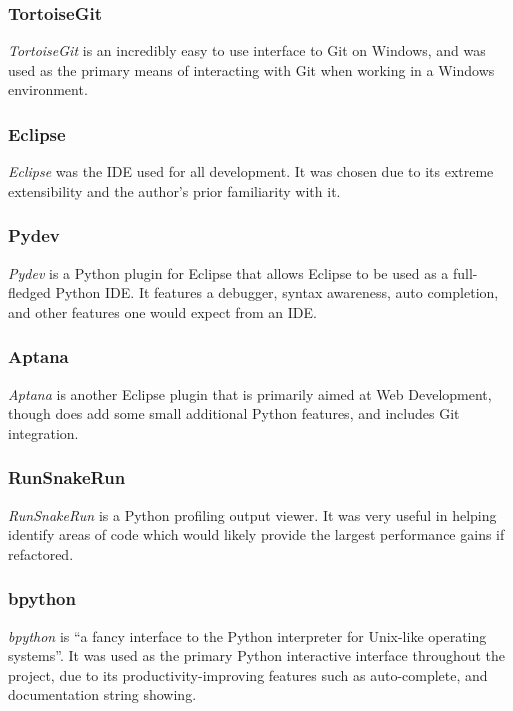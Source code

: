 \documentclass[a4paper,11pt]{report}
\begin{document}
\subsubsection*{TortoiseGit}
\emph{TortoiseGit} \citep{prog:tortoisegit} is an incredibly easy to use interface to Git on Windows, and was used as the primary means of interacting with Git when working in a Windows environment.

\subsubsection*{Eclipse}
\emph{Eclipse} \citep{prog:eclipse} was the IDE used for all development. It was chosen due to its extreme extensibility and the author's prior familiarity with it.

\subsubsection*{Pydev}
\emph{Pydev} \citep{prog:pydev} is a Python plugin for Eclipse that allows Eclipse to be used as a full-fledged Python IDE. It features a debugger, syntax awareness, auto completion, and other features one would expect from an IDE.

\subsubsection*{Aptana}
\emph{Aptana} \citep{prog:aptana} is another Eclipse plugin that is primarily aimed at Web Development, though does add some small additional Python features, and includes Git integration.

\subsubsection*{RunSnakeRun}
\emph{RunSnakeRun} \citep{prog:runsnakerun} is a Python profiling output viewer. It was very useful in helping identify areas of code which would likely provide the largest performance gains if refactored.

\subsubsection*{bpython}
\emph{bpython} \citep{prog:bpython} is ``a fancy interface to the Python interpreter for Unix-like operating systems''. It was used as the primary Python interactive interface throughout the project, due to its productivity-improving features such as auto-complete, and documentation string showing.
\end{document}
